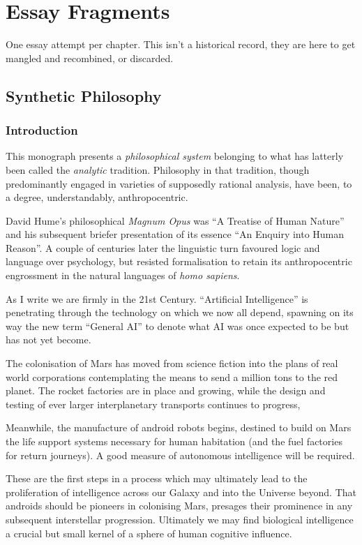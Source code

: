 \documentclass[10pt,titlepage]{book}
\begin{document}
  
\part{Essay Fragments}

One essay attempt per chapter.
This isn't a historical record, they are here to get mangled and recombined, or discarded.

\chapter{Synthetic Philosophy}

\section{Introduction}

This monograph presents a \emph{philosophical system} belonging to what has latterly been called the \emph{analytic} tradition.
Philosophy in that tradition, though predominantly engaged in varieties of supposedly rational analysis, have been, to a degree, understandably, anthropocentric.

David Hume's philosophical \emph{Magnum Opus} was ``A Treatise of Human Nature'' \cite{humeTHN} and his subsequent briefer presentation of its essence ``An Enquiry into Human Reason''\cite{humeECHU}.
A couple of centuries later the linguistic turn favoured logic and language over psychology, but resisted formalisation to retain its anthropocentric engrossment in the natural languages of \emph{homo sapiens}.

As I write we are firmly in the 21st Century.
``Artificial Intelligence'' is penetrating through the technology on which we now all depend, spawning on its way the new term ``General AI'' to denote what AI was once expected to be but has not yet become.

The colonisation of Mars has moved from science fiction into the plans of real world corporations contemplating the means to send a million tons to the red planet.
The rocket factories are in place and growing, while the design and testing of ever larger interplanetary transports continues to progress,

Meanwhile, the manufacture of android robots begins, destined to build on Mars the life support systems necessary for human habitation (and the fuel factories for return journeys).
A good measure of autonomous intelligence will be required.

These are the first steps in a process which may ultimately lead to the proliferation of intelligence across our Galaxy and into the Universe beyond.
That androids should be pioneers in colonising Mars, presages their prominence in any subsequent interstellar progression.
Ultimately we may find biological intelligence a crucial but small kernel of a sphere of human cognitive influence.
\end{document}
